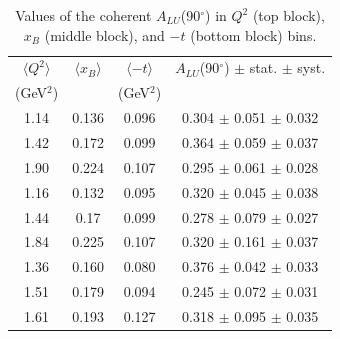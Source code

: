 \documentclass[aps,prc,preprint,superscriptaddress]{revtex4}
\begin{document}
\begin{table}[!h]
   \begin{center}
      \begin{tabular}{|c|c|c|c|}
         \hline
 $\langle Q^{2} \rangle$ & $\langle x_{B} \rangle$ & $\langle -t \rangle$  & $A_{LU}$(90$^{\circ}$) $\pm$ stat. $\pm$ syst.\\
 (GeV$^{2}$) &           & (GeV$^{2}$) &  \\
  \hline
  1.14  & 0.136 & 0.096 &  0.304  $\pm$ 0.051  $\pm$ 0.032 \\
  1.42  & 0.172 & 0.099 &  0.364  $\pm$ 0.059  $\pm$ 0.037 \\
  1.90  & 0.224 & 0.107 &  0.295  $\pm$ 0.061  $\pm$ 0.028 \\
  \hline 
  1.16  & 0.132 & 0.095 &  0.320  $\pm$ 0.045  $\pm$ 0.038 \\
  1.44  & 0.17  & 0.099 &  0.278  $\pm$ 0.079  $\pm$ 0.027 \\
  1.84  & 0.225 & 0.107 &  0.320  $\pm$ 0.161  $\pm$ 0.037 \\
  \hline 
  1.36  & 0.160 & 0.080 &  0.376  $\pm$ 0.042  $\pm$ 0.033 \\
  1.51  & 0.179 & 0.094 &  0.245  $\pm$ 0.072  $\pm$ 0.031 \\
  1.61  & 0.193 & 0.127 &  0.318  $\pm$ 0.095  $\pm$ 0.035 \\
  \hline
  \end{tabular}
  \caption{Values of the coherent $A_{LU}$(90$^{\circ}$) in $Q^2$ (top block), $x_B$ (middle block), and $-t$ (bottom block) bins. }
  \label{table:Coh_BSA_90}
  \end{center}
\end{table}

\end{document}

